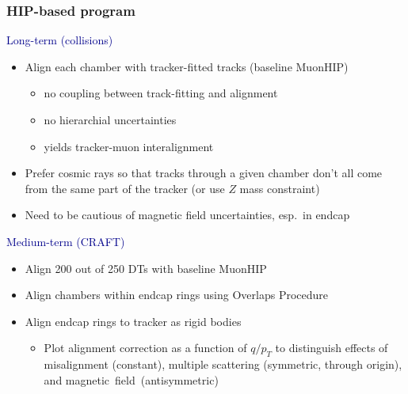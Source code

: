 \documentclass[compress]{beamer}
\begin{document}
\begin{frame}
\frametitle{HIP-based program}
\small
\textcolor{darkblue}{\large Long-term (collisions)}
\begin{itemize}
\item Align each chamber with tracker-fitted tracks (baseline MuonHIP)
\begin{itemize}
  \item no coupling between track-fitting and alignment
  \item no hierarchial uncertainties
  \item yields tracker-muon interalignment
\end{itemize}
\item Prefer cosmic rays so that tracks through a given chamber don't all
  come from the same part of the tracker (or use $Z$ mass constraint)
\item Need to be cautious of magnetic field uncertainties, esp.\ in endcap
\end{itemize}

\vfill
\textcolor{darkblue}{\large Medium-term (CRAFT)}
\begin{itemize}
\item Align 200 out of 250 DTs with baseline MuonHIP
\item Align chambers within endcap rings using Overlaps Procedure
\item Align endcap rings to tracker as rigid bodies
\begin{itemize}
\item Plot alignment correction as a function of $q/p_T$ to
  distinguish effects of misalignment (constant), multiple scattering (symmetric, through origin),
  and \mbox{magnetic field (antisymmetric)\hspace{-1 cm}}
\end{itemize}

\end{itemize}
\end{frame}
\end{document}
